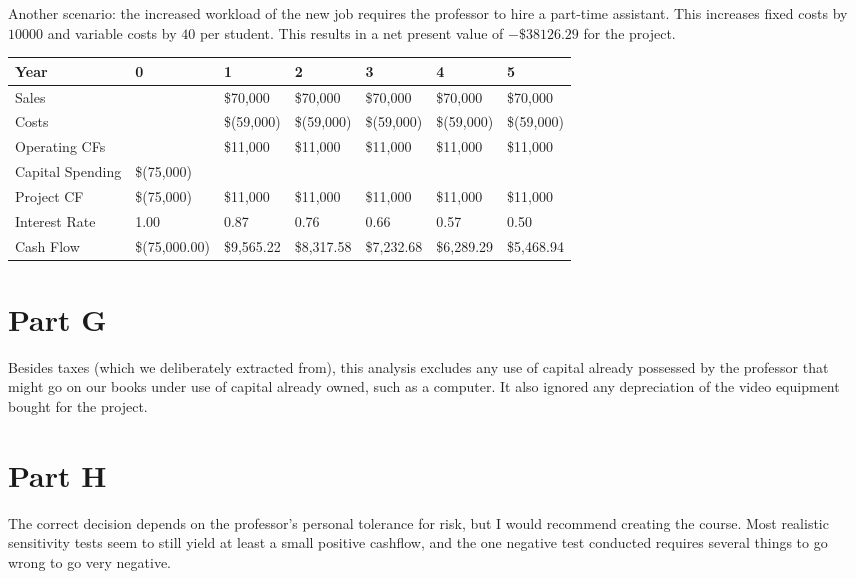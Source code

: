 \documentclass[12pt, letterpaper, parskip = full]{article}
\begin{document}
Another scenario: the increased workload of the new job requires the professor to hire a part-time assistant. This increases fixed costs by \(10000\) and variable costs by \(40\) per student. This results in a net present value of \(-\$38126.29\) for the project.

\begin{table}[!ht]
    \centering
    \begin{tabularx}{\textwidth}{|X|X|X|X|X|X|X|}
    \hline
        Year & 0 & 1 & 2 & 3 & 4 & 5 \\ \hline
        Sales & ~ &  \$70,000  &  \$70,000  &  \$70,000  &  \$70,000  &  \$70,000  \\ \hline
        Costs & ~ &  \$(59,000) &  \$(59,000) &  \$(59,000) &  \$(59,000) &  \$(59,000) \\ \hline
        Operating CFs & ~ &  \$11,000  &  \$11,000  &  \$11,000  &  \$11,000  &  \$11,000  \\ \hline
        Capital Spending &  \$(75,000) & ~ & ~ & ~ & ~ & ~ \\ \hline
        Project CF &  \$(75,000) &  \$11,000  &  \$11,000  &  \$11,000  &  \$11,000  &  \$11,000  \\ \hline
        Interest Rate &  1.00  &  0.87  &  0.76  &  0.66  &  0.57  &  0.50  \\ \hline
        Cash Flow &  \$(75,000.00) &  \$9,565.22  &  \$8,317.58  &  \$7,232.68  &  \$6,289.29  &  \$5,468.94 \\ \hline
    \end{tabularx}
\end{table}

\section{Part G}

Besides taxes (which we deliberately extracted from), this analysis excludes any use of capital already possessed by the professor that might go on our books under use of capital already owned, such as a computer. It also ignored any depreciation of the video equipment bought for the project.

\section{Part H}

The correct decision depends on the professor's personal tolerance for risk, but I would recommend creating the course. Most realistic sensitivity tests seem to still yield at least a small positive cashflow, and the one negative test conducted requires several things to go wrong to go very negative.
\end{document}
